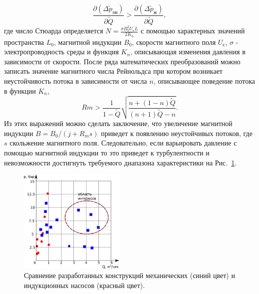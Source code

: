 \begin{equation*}
    \frac{\partial (\Delta \widetilde{p}_{эм})} {\partial \widetilde{Q}} > \frac{\partial (\Delta \widetilde{p}_{ж})} {\partial \widetilde{Q}},
\end{equation*}
где число Стюарда определяется $N = \frac{\sigma B_{0}^2 U_{с} L}{2K_{n}}$ с помощью характерных значений пространства $L_0$, магнитной индукции $B_{0}$, скорости магнитного поля $U_{с}$, $\sigma$ - электропроводность среды и функция $K_{n}$, описывающая изменения давления в зависимости от скорости. После ряда математических преобразований можно записать значение магнитного числа Рейнольдса при котором возникает неустойчивость потока в зависимости от числа $n$, описывающее поведение потока в функции $K_{n}$, 
\begin{equation*}
    Rm > \frac{1}{1-\widetilde{Q}} \sqrt{\frac{n+(1-n) \widetilde{Q}}{(n+1)\widetilde{Q}-n}}.
\end{equation*}
Из этих выражений можно сделать заключение, что увеличение магнитной индукции $B = B_{0} / (j + R_{m}s)$ приведет к появлению неустойчивых потоков, где $s$ скольжение магнитного поля. Следовательно, если варьировать давление с помощью магнитной индукции то это приведет к турбулентности и невозможности достигнуть требуемого диапазона характеристики на Рис.~\ref{fig:intreting_pq}. 
\begin{figure}
	\centering
	\includegraphics[width=0.45\textwidth]{Synopsis/images/part1/pQ_ru.png}
	\caption{Сравнение разработанных конструкций механических (синий цвет) и индукционных насосов (красный цвет).}
	\label{fig:intreting_pq}	
\end{figure}


